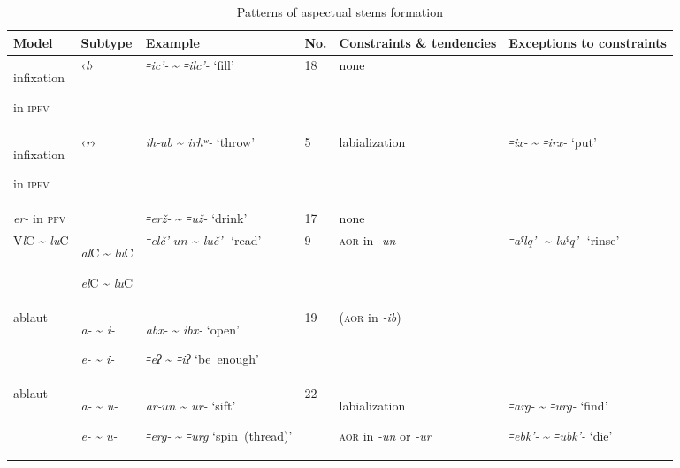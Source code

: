 \documentclass[output=paper]{langsci/langscibook}
\begin{document}
\begin{table}

\caption{Patterns of aspectual stems formation}\label{tab:4:6}

\begin{tabular}{@{}m{}<{\raggedright}m{}<{\raggedright}m{}<{\raggedright}lm{}<{\raggedright}>{\raggedright}m{}@{}}
\toprule
\footnotesize Model & 
\footnotesize Subtype & 
\footnotesize Example & 
\footnotesize No. & 
\footnotesize Constraints \& tendencies &  
\footnotesize Exceptions to constraints \tabularnewline \midrule
infixation

in \textsc{ipfv} & 
‹\emph{l}› & 
\emph{꞊ic'-} \textasciitilde{} \emph{꞊ilc'-} `fill' & 
18 & 
none & 
\tabularnewline \midrule

infixation

in \textsc{ipfv} & 
‹\emph{r}› & 
\emph{ih-\(ub\)} \textasciitilde{} \emph{irhʷ-} `throw' & 
5 & 
labialization & 
\emph{꞊ix-} \textasciitilde{} \emph{꞊irx-} `put'\tabularnewline \midrule
\emph{er-} in \textsc{pfv} & & \emph{꞊erž-} \textasciitilde{} \emph{꞊už-} `drink' &
17 & none &\tabularnewline \midrule

V\emph{l}C \textasciitilde{} \emph{lu}C & 
\emph{al}C \textasciitilde{} \emph{lu}C

\emph{el}C \textasciitilde{} \emph{lu}C & 
\emph{꞊elč'-\(un\)} \textasciitilde{} \emph{luč'-} `read' & 
9 & 
\textsc{aor} in \emph{-un} & 
\emph{꞊aˤlq'-} \textasciitilde{} \emph{luˤq'-} `rinse'\tabularnewline\midrule

ablaut & 
\emph{a-} \textasciitilde{} \emph{i-}

\emph{e-} \textasciitilde{} \emph{i-} & 
\emph{abx-} \textasciitilde{} \emph{ibx-} `open'

\emph{꞊eʔ} \textasciitilde{} \emph{꞊iʔ} `be~enough' & 
19 & 
(\textsc{aor} in \emph{-ib}) & 
\tabularnewline \midrule

ablaut & 
\emph{a-} \textasciitilde{} \emph{u-}

\emph{e-} \textasciitilde{} \emph{u-} & 
\emph{ar-\(un\)} \textasciitilde{} \emph{ur-} `sift'

\emph{꞊erg-} \textasciitilde{} \emph{꞊urg} `spin~(thread)' & 
22 & 
labialization

\textsc{aor} in \emph{-un} or \emph{-ur} & 
\emph{꞊arg-} \textasciitilde{} \emph{꞊urg-} `find'

\emph{꞊ebk'-} \textasciitilde{} \emph{꞊ubk'-} `die'\tabularnewline
\bottomrule
\end{tabular}
\end{table}
\end{document}
